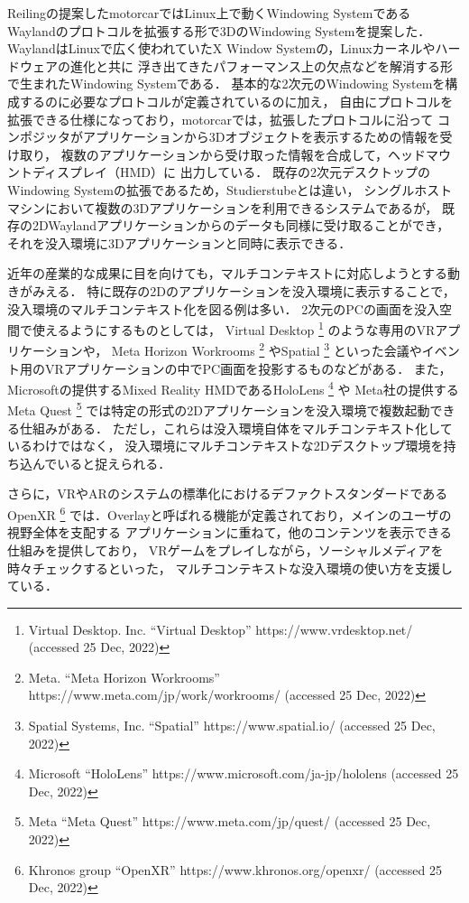 Reilingの提案したmotorcar\cite{reiling}ではLinux上で動くWindowing Systemである
Waylandのプロトコルを拡張する形で3DのWindowing Systemを提案した．
WaylandはLinuxで広く使われていたX Window Systemの，Linuxカーネルやハードウェアの進化と共に
浮き出てきたパフォーマンス上の欠点などを解消する形で生まれたWindowing Systemである．
基本的な2次元のWindowing Systemを構成するのに必要なプロトコルが定義されているのに加え，
自由にプロトコルを拡張できる仕様になっており，motorcarでは，拡張したプロトコルに沿って
コンポジッタがアプリケーションから3Dオブジェクトを表示するための情報を受け取り，
複数のアプリケーションから受け取った情報を合成して，ヘッドマウントディスプレイ（HMD）に
出力している．
既存の2次元デスクトップのWindowing Systemの拡張であるため，Studierstubeとは違い，
シングルホストマシンにおいて複数の3Dアプリケーションを利用できるシステムであるが，
既存の2DWaylandアプリケーションからのデータも同様に受け取ることができ，
それを没入環境に3Dアプリケーションと同時に表示できる．

近年の産業的な成果に目を向けても，マルチコンテキストに対応しようとする動きがみえる．
特に既存の2Dのアプリケーションを没入環境に表示することで，
没入環境のマルチコンテキスト化を図る例は多い．
2次元のPCの画面を没入空間で使えるようにするものとしては，
Virtual Desktop
\footnote{Virtual Desktop. Inc. ``Virtual Desktop'' https://www.vrdesktop.net/ (accessed 25 Dec, 2022)}
のような専用のVRアプリケーションや，
Meta Horizon Workrooms
\footnote{Meta. ``Meta Horizon Workrooms'' https://www.meta.com/jp/work/workrooms/ (accessed 25 Dec, 2022)}
やSpatial
\footnote{Spatial Systems, Inc. ``Spatial'' https://www.spatial.io/ (accessed 25 Dec, 2022)}
といった会議やイベント用のVRアプリケーションの中でPC画面を投影するものなどがある．
また，Microsoftの提供するMixed Reality HMDであるHoloLens
\footnote{Microsoft ``HoloLens'' https://www.microsoft.com/ja-jp/hololens (accessed 25 Dec, 2022)}
や Meta社の提供するMeta Quest
\footnote{Meta ``Meta Quest'' https://www.meta.com/jp/quest/ (accessed 25 Dec, 2022)}
では特定の形式の2Dアプリケーションを没入環境で複数起動できる仕組みがある．
ただし，これらは没入環境自体をマルチコンテキスト化しているわけではなく，
没入環境にマルチコンテキストな2Dデスクトップ環境を持ち込んでいると捉えられる．

さらに，VRやARのシステムの標準化におけるデファクトスタンダードであるOpenXR
\footnote{Khronos group ``OpenXR'' https://www.khronos.org/openxr/ (accessed 25 Dec, 2022)}
では．Overlayと呼ばれる機能が定義されており，メインのユーザの視野全体を支配する
アプリケーションに重ねて，他のコンテンツを表示できる仕組みを提供しており，
VRゲームをプレイしながら，ソーシャルメディアを時々チェックするといった，
マルチコンテキストな没入環境の使い方を支援している．

